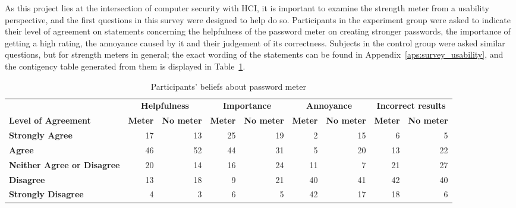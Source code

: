     As this project lies at the intersection of computer security with HCI, it is important to examine the strength meter from a usability perspective, and the first questions in this survey were designed to help do so. Participants in the experiment group were asked to indicate their level of agreement on statements concerning the helpfulness of the password meter on creating stronger passwords, the importance of getting a high rating, the annoyance caused by it and their judgement of its correctness. Subjects in the control group were asked similar questions, but for strength meters in general; the exact wording of the statements can be found in Appendix~\ref{aps:survey_usability}, and the contigency table generated from them is displayed in Table~\ref{tab:beliefs}.

    \begin{table}[htpb]
      \centering
      \scriptsize
      \hspace*{-2cm}
      \begin{tabular}{p{3cm} rrrrrrrr}
        \toprule
         & \multicolumn{2}{c}{\textbf{Helpfulness}} & \multicolumn{2}{c}{\textbf{Importance}} & \multicolumn{2}{c}{\textbf{Annoyance}} & \multicolumn{2}{c}{\textbf{Incorrect results}} \\
        \textbf{Level of Agreement} & \textbf{Meter} & \textbf{No meter} & \textbf{Meter} & \textbf{No meter} & \textbf{Meter} & \textbf{No meter} & \textbf{Meter} & \textbf{No meter} \\
        \midrule
         \textbf{Strongly Agree} & 17 & 13 & 25 & 19 & 2 & 15 & 6 & 5 \\
         \textbf{Agree} & 46 & 52 & 44 & 31 & 5 & 20 & 13 & 22 \\
         \textbf{Neither Agree \newline or Disagree} & 20 & 14 & 16 & 24 & 11 & 7 & 21 & 27 \\
         \textbf{Disagree} & 13 & 18 & 9 & 21 & 40 & 41 & 42 & 40 \\
         \textbf{Strongly Disagree} & 4 & 3 & 6 & 5 & 42 & 17 & 18 & 6\\
        \bottomrule
      \end{tabular}
      \caption{Participants' beliefs about password meter}
      \label{tab:beliefs}
    \end{table}

